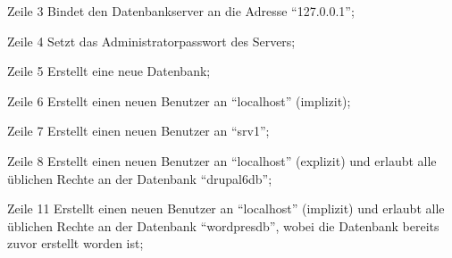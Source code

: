 \begin{asparadesc}
\item[Zeile 3] Bindet den Datenbankserver an die Adresse ``127.0.0.1'';
\item[Zeile 4] Setzt das Administratorpasswort des Servers;
\item[Zeile 5] Erstellt eine neue Datenbank;
\item[Zeile 6] Erstellt einen neuen Benutzer an ``localhost'' (implizit);
\item[Zeile 7] Erstellt einen neuen Benutzer an ``srv1'';
\item[Zeile 8] Erstellt einen neuen Benutzer an ``localhost'' (explizit) und
erlaubt alle üblichen Rechte an der Datenbank ``drupal6db'';
\item[Zeile 11] Erstellt einen neuen Benutzer an ``localhost'' (implizit) und
erlaubt alle üblichen Rechte an der Datenbank ``wordpresdb'', wobei die Datenbank
bereits zuvor erstellt worden ist;
\end{asparadesc}

